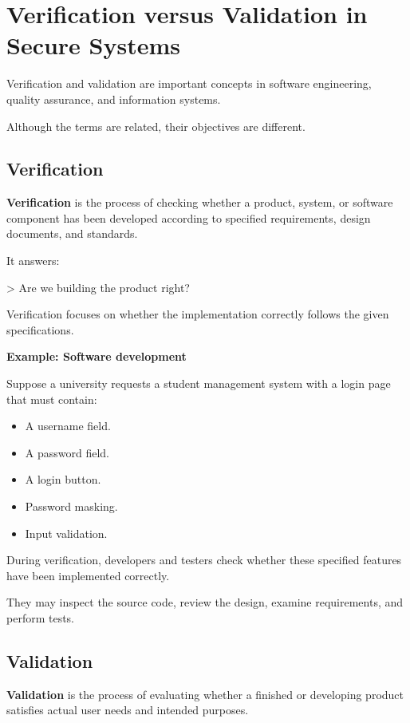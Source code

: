 \section{Verification versus Validation in Secure Systems}


Verification and validation are important concepts in software engineering, quality assurance, and information systems.

Although the terms are related, their objectives are different.

\subsection{Verification}

\textbf{Verification} is the process of checking whether a product, system, or software component has been developed according to specified requirements, design documents, and standards.

It answers:

> Are we building the product right?

Verification focuses on whether the implementation correctly follows the given specifications.

\textbf{Example: Software development}

Suppose a university requests a student management system with a login page that must contain:

\begin{itemize}
\item A username field.
\item A password field.
\item A login button.
\item Password masking.
\item Input validation.
\end{itemize}

During verification, developers and testers check whether these specified features have been implemented correctly.

They may inspect the source code, review the design, examine requirements, and perform tests.

\subsection{Validation}

\textbf{Validation} is the process of evaluating whether a finished or developing product satisfies actual user needs and intended purposes.

